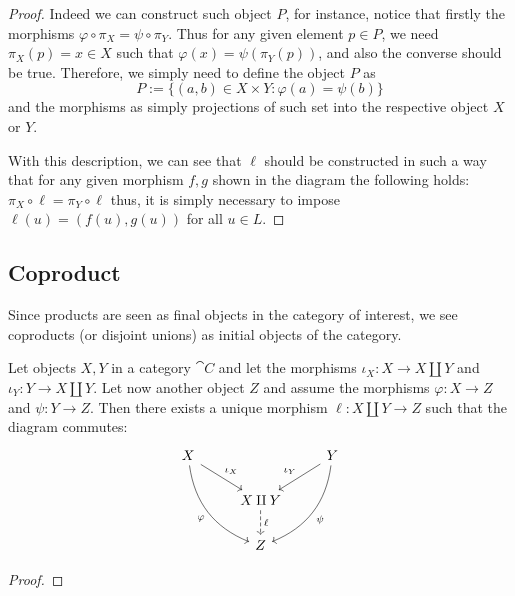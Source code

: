\begin{proof}
   Indeed we can construct such object \(P\), for instance, notice that firstly
   the morphisms \(\varphi \circ \pi_X = \psi \circ \pi_Y\). Thus for any
   given element \(p \in P\), we need \(\pi_X(p) = x \in X\) such that
   \(\varphi(x) = \psi(\pi_Y(p))\), and also the converse should be true.
   Therefore, we simply need to define the object \(P\) as 
   \[
      P := \{(a, b) \in X \times Y : \varphi(a) = \psi(b)\} 
   \] 
   and the morphisms as simply projections of such set into the respective
   object \(X\) or \(Y\).

   With this description, we can see that \(\ell\) should be constructed in such
   a way that for any given morphism \(f, g\) shown in the diagram the following
   holds: \(\pi_X \circ \ell = \pi_Y \circ \ell\) thus, it is simply necessary
   to impose \(\ell(u) = (f(u), g(u))\) for all \(u \in L\).
\end{proof}

\subsection{Coproduct}

Since products are seen as final objects in the category of interest, we see
coproducts (or disjoint unions) as initial objects of the category.

\begin{proposition}
   Let objects \(X, Y\) in a category \(\cat C\) and let the morphisms
   \(\iota_X : X \to X \amalg Y\) and \(\iota_Y : Y \to X \amalg Y\). Let now
   another object \(Z\) and assume the morphisms \(\varphi : X \to Z\) and
   \(\psi : Y \to Z\). Then there exists a unique morphism \(\ell : X \amalg Y
   \to Z\) such that the diagram commutes:
    \[
      \begin{tikzcd}
        X
        \ar[ddr, bend right, swap,  "\varphi"]
        \ar[dr, "\iota_X"]
          &
            &Y
            \ar[dl, swap, "\iota_Y"]
            \ar[ddl, bend left, "\psi"]
            \\
          &X \amalg Y
          \ar[d, dashed, "\ell"]
            &\\
          &Z
      \end{tikzcd}
   \] 
\end{proposition}

\begin{proof}
\end{proof}
   
